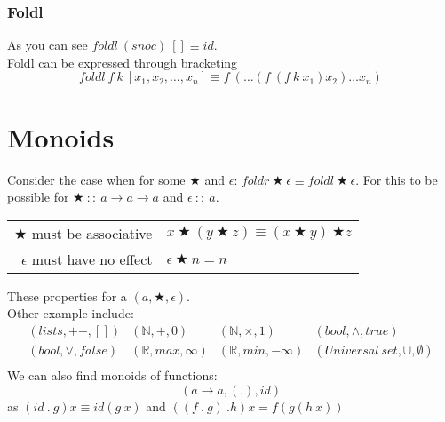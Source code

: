 \documentclass{report}
\begin{document}
\subsubsection*{Foldl}
As you can see $foldl \ (snoc) \ [] \equiv id$.
\\ Foldl can be expressed through bracketing
\[foldl \ f \ k \ [x_1, x_2, \dots, x_n] \equiv f \ (\dots (f \ (f \ k \ x_1) x_2) \dots x_n)\]

\section*{Monoids}
Consider the case when for some $\bigstar $ and $\epsilon$: $foldr \ \bigstar \ \epsilon \equiv foldl \ \bigstar \ \epsilon$.
For this to be possible for $\bigstar \ :: \ a \to a \to a$ and $\epsilon \ :: \ a$.
\begin{center}
	\begin{tabular}{r l}
		$\bigstar$ must be associative & $x \ \bigstar \ (y \ \bigstar \ z) \equiv (x \ \bigstar \ y) \ \bigstar z$ \\
		$\epsilon$ must have no effect & $\epsilon \ \bigstar \ n = n$                                              \\
	\end{tabular}
\end{center}
These properties for a  $(a, \bigstar, \epsilon)$.
\\ Other example include:
\[\begin{matrix}
		(lists, ++, [])     & (\mathbb{N}, +, 0)        & (\mathbb{N}, \times, 1)    & (bool, \land, true)                \\
		(bool, \lor, false) & (\mathbb{R}, max, \infty) & (\mathbb{R}, min, -\infty) & (Universal \ set, \cup, \emptyset) \\
	\end{matrix}\]
We can also find monoids of functions:
\[(a \to a, (.), id)\]
as $(id \ . \ g) x \equiv id (g \ x)$ and $((f \ . \ g) \ . h) x = f(g(h \ x))$
\end{document}
